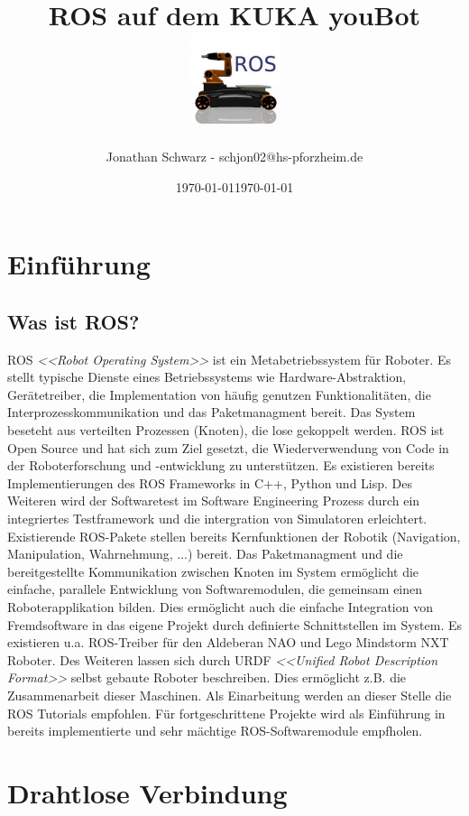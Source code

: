 \documentclass[9pt,a4paper,DIV=11]{scrartcl}
\title
{
ROS auf dem KUKA youBot\\
\includegraphics[width=0.20\textwidth]{files/youbot_ros.jpg}
}
\date{\today{}}
\author{Jonathan Schwarz - schjon02@hs-pforzheim.de}
\date{\today{}}
\begin{document}
\renewcommand*\contentsname{Inhalt}
\renewcommand*\listtablename{Tabellen}
\renewcommand*\listfigurename{Abbildungen}

\maketitle
\thispagestyle{empty}
\newpage
\tableofcontents
\newpage
\section{Einführung}
\subsection{Was ist ROS?}
ROS \textit{<<Robot Operating System>>} ist ein Metabetriebssystem für Roboter. Es stellt typische Dienste eines Betriebssystems wie Hardware-Abstraktion, Gerätetreiber, die Implementation von häufig genutzen Funktionalitäten, die Interprozesskommunikation und das Paketmanagment bereit. Das System beseteht aus verteilten Prozessen (Knoten), die lose gekoppelt werden. ROS ist Open Source und hat sich zum Ziel gesetzt, die Wiederverwendung von Code in der Roboterforschung und -entwicklung zu unterstützen. Es existieren bereits Implementierungen des ROS Frameworks in C++, Python und Lisp. Des Weiteren wird der Softwaretest im Software Engineering Prozess durch ein integriertes Testframework und die intergration von Simulatoren erleichtert. Existierende ROS-Pakete stellen bereits Kernfunktionen der Robotik (Navigation, Manipulation, Wahrnehmung, ...) bereit. 
Das Paketmanagment und die bereitgestellte Kommunikation zwischen Knoten im System ermöglicht die einfache, parallele Entwicklung von Softwaremodulen, die gemeinsam einen Roboterapplikation bilden. Dies ermöglicht auch die einfache Integration von Fremdsoftware in das eigene Projekt durch definierte Schnittstellen im System. Es existieren u.a. ROS-Treiber für den Aldeberan NAO und Lego Mindstorm NXT Roboter. Des Weiteren lassen sich durch URDF \textit{<<Unified Robot Description Format>>} selbst gebaute Roboter beschreiben. Dies ermöglicht z.B. die Zusammenarbeit dieser Maschinen.
Als Einarbeitung werden an dieser Stelle die ROS Tutorials \cite{ROSTUT} empfohlen. Für fortgeschrittene Projekte wird \citep{ROSBYEX} als Einführung in bereits implementierte und sehr mächtige ROS-Softwaremodule empfholen. 

\newpage
 
\section{Drahtlose Verbindung}
\end{document}
